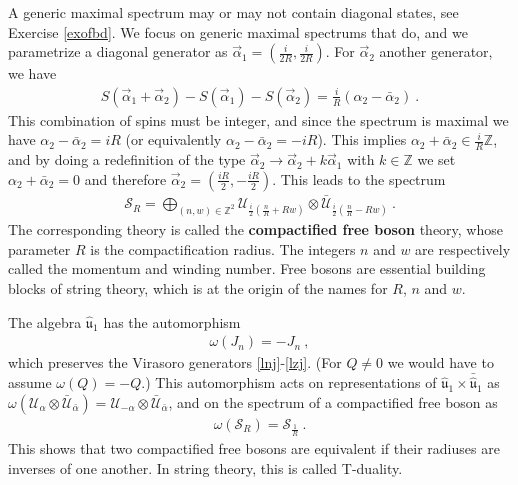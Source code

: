 \documentclass[12pt, a4paper, notitlepage, twoside]{report}
\numberwithin{equation}{section}
\theoremstyle{break}
\begin{document}
A generic maximal spectrum may or may not contain diagonal states, see Exercise \ref{exofbd}. We focus on generic maximal spectrums that do, and we parametrize a diagonal generator as  $\vec\alpha_1=(\frac{i}{2R},\frac{i}{2R})$. For $\vec\alpha_2$ another generator, we have 
\begin{align}
 S(\vec\alpha_1 + \vec\alpha_2) - S(\vec\alpha_1)-S(\vec\alpha_2) = \frac{i}{R}(\alpha_2-\bar\alpha_2)\ .
\end{align}
This combination of spins must be integer, and since the spectrum is maximal we have $\alpha_2-\bar\alpha_2=iR$ (or equivalently $\alpha_2-\bar\alpha_2=-iR$). This implies $\alpha_2+\bar\alpha_2 \in \frac{i}{R}\mathbb{Z}$,
and by doing a redefinition of the type $\vec\alpha_2\to \vec\alpha_2+k\vec\alpha_1$ with $k\in\mathbb{Z}$ we set $\alpha_2+\bar\alpha_2=0$ and therefore $\vec\alpha_2=(\frac{iR}{2},-\frac{iR}{2})$. This leads to the spectrum
\begin{align}
 \boxed{\mathcal{S}_R = \bigoplus_{(n,w)\in {\mathbb{Z}^2}} \mathcal{U}_{\frac{i}{2}\left(\frac{n}{R} + Rw\right)} \otimes \bar{\mathcal{U}}_{\frac{i}{2}\left(\frac{n}{R} - Rw\right)} }\ .
\label{sr}
\end{align}
The corresponding theory is called the \textbf{\boldmath compactified free boson} theory, whose parameter $R$ is  the compactification radius.
The integers $n$ and $w$ are respectively called the momentum and winding number.
Free bosons are essential building blocks of string theory, which is at the origin of the names for $R$, $n$ and $w$.

The  algebra $\hat{\mathfrak{u}}_1$ has the automorphism
\begin{align}
 \omega(J_n) = -J_n \ ,
\end{align}
which preserves the Virasoro generators \eqref{lnj}-\eqref{lzj}. (For $Q\neq 0$ we would have to assume $\omega(Q)=-Q$.)
This automorphism acts on representations of $\hat{\mathfrak{u}}_1 \times \bar{\hat{\mathfrak{u}}}_1$ as $\omega(\mathcal{U}_\alpha \otimes \bar{\mathcal{U}}_{\bar{\alpha}}) =  \mathcal{U}_{-\alpha} \otimes \bar{\mathcal{U}}_{\bar{\alpha}}$, and on the spectrum of a compactified free boson as 
\begin{align}
 \omega(\mathcal{S}_R) = \mathcal{S}_{\frac{1}{R}}\ .
\end{align}
This shows that two compactified free bosons are equivalent if their radiuses are inverses of one another. In string theory, this is called T-duality.
\end{document}
